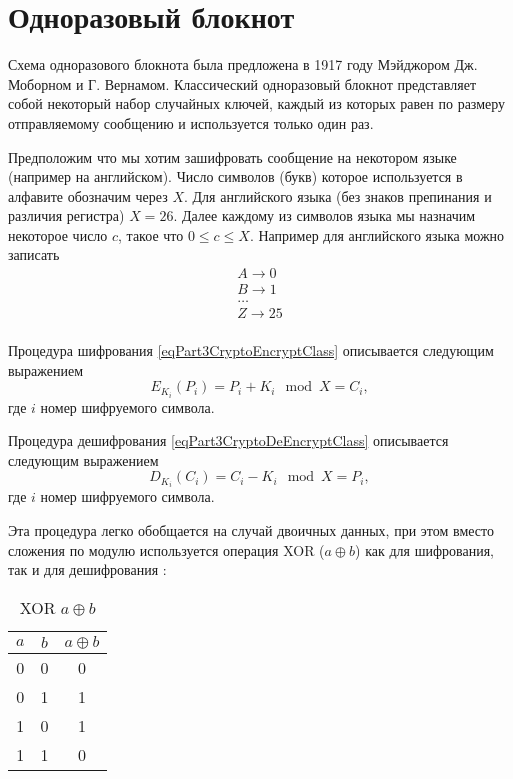 \section{Одноразовый блокнот}
Схема одноразового блокнота была предложена в 1917 году Мэйджором
Дж. Моборном и Г. Вернамом. Классический одноразовый блокнот представляет собой
некоторый набор случайных ключей, каждый из которых равен по размеру
отправляемому сообщению и используется только один раз. 

Предположим что мы хотим зашифровать сообщение на некотором языке
(например на английском). Число символов (букв) которое используется в
алфавите обозначим через $X$. Для английского языка (без знаков
препинания и различия регистра) $X = 26$. Далее каждому из символов
языка мы назначим некоторое число $c$, такое что $0 \le c \le
X$. Например для английского языка можно записать
\begin{equation}
\begin{array}{c}
A \rightarrow 0 \\
B \rightarrow 1 \\
\dots \\
Z \rightarrow 25 \\
\end{array}
\nonumber
\end{equation}
  
Процедура шифрования \eqref{eqPart3CryptoEncryptClass} описывается
следующим выражением
\begin{equation}
E_{K_i}\left(P_i\right) = P_i + K_i \mod X = C_i,
\label{eqPart3CryptoEncryptVernam}
\end{equation}
где $i$ номер шифруемого символа.

Процедура дешифрования \eqref{eqPart3CryptoDeEncryptClass} описывается
следующим выражением
\begin{equation}
D_{K_i}\left(C_i\right) = C_i - K_i \mod X = P_i,
\label{eqPart3CryptoDeEncryptVernam}
\end{equation}
где $i$ номер шифруемого символа.

Эта процедура легко обобщается на случай двоичных данных, при этом
вместо сложения по модулю используется операция XOR ($a \oplus b$) как
для шифрования, так и для дешифрования :
\begin{table}
\centering
\begin{tabular}{|c|c|c|}
\hline
$a$ & $b$ & $a \oplus b$ \\ \hline
0  & 0 & 0 \\
0  & 1 & 1 \\
1  & 0 & 1 \\
1  & 1 & 0 \\ \hline
\end{tabular}
\caption{XOR $a \oplus b$}
\label{tblXOR}
\end{table}


